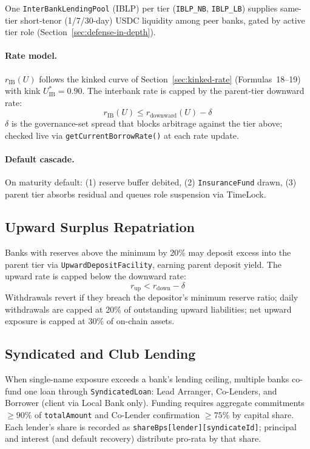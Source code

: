\documentclass[12pt,a4paper]{report}
\begin{document}
One \texttt{InterBankLendingPool} (IBLP) per tier (\texttt{IBLP\_NB}, \texttt{IBLP\_LB}) supplies same-tier short-tenor (1/7/30-day) USDC liquidity among peer banks, gated by active tier role (Section~\ref{sec:defense-in-depth}).

\paragraph{Rate model.}
$r_{\text{IB}}(U)$ follows the kinked curve of Section~\ref{sec:kinked-rate} (Formulas~18--19) with kink $U^{*}_{\text{IB}} = 0.90$. The interbank rate is capped by the parent-tier downward rate:
\begin{equation}
r_{\text{IB}}(U) \le r_{\text{downward}}(U) - \delta
\end{equation}
\noindent $\delta$ is the governance-set spread that blocks arbitrage against the tier above; checked live via \texttt{getCurrentBorrowRate()} at each rate update.

\paragraph{Default cascade.}
On maturity default: (1) reserve buffer debited, (2) \texttt{InsuranceFund} drawn, (3) parent tier absorbs residual and queues role suspension via TimeLock.

\subsection{Upward Surplus Repatriation}
\label{sec:upward-flow}

Banks with reserves above the minimum by 20\% may deposit excess into the parent tier via \texttt{UpwardDepositFacility}, earning parent deposit yield. The upward rate is capped below the downward rate:
\begin{equation}
r_{\text{up}} < r_{\text{down}} - \delta
\end{equation}
\noindent Withdrawals revert if they breach the depositor's minimum reserve ratio; daily withdrawals are capped at 20\% of outstanding upward liabilities; net upward exposure is capped at 30\% of on-chain assets.

\subsection{Syndicated and Club Lending}
\label{sec:syndicated-lending}

When single-name exposure exceeds a bank's lending ceiling, multiple banks co-fund one loan through \texttt{SyndicatedLoan}: Lead Arranger, Co-Lenders, and Borrower (client via Local Bank only). Funding requires aggregate commitments $\ge 90\%$ of \texttt{totalAmount} and Co-Lender confirmation $\ge 75\%$ by capital share. Each lender's share is recorded as \texttt{shareBps[lender][syndicateId]}; principal and interest (and default recovery) distribute pro-rata by that share.
\end{document}
